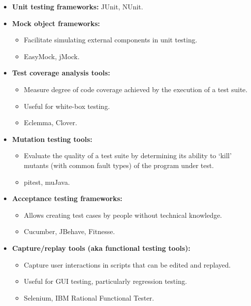 \documentclass[../ESOF_notes.tex]{subfiles}
\begin{document}
\begin{itemize}
    \item \textbf{Unit testing frameworks:} JUnit, NUnit.
    \item \textbf{Mock object frameworks:}
          \begin{itemize}
              \item Facilitate simulating external components in unit testing.
              \item EasyMock, jMock.
          \end{itemize}
    \item \textbf{Test coverage analysis tools:}
          \begin{itemize}
              \item Measure degree of code coverage
                    achieved by the execution of a test suite.
              \item Useful for white-box testing.
              \item Eclemma, Clover.
          \end{itemize}
    \item \textbf{Mutation testing tools:}
          \begin{itemize}
              \item Evaluate the quality of a test suite by
                    determining its ability to ‘kill’ mutants
                    (with common fault types) of the program under test.
              \item pitest, muJava.
          \end{itemize}
    \item \textbf{Acceptance testing frameworks:}
          \begin{itemize}
              \item Allows creating test cases by people
                    without technical knowledge.
              \item Cucumber, JBehave, Fitnesse.
          \end{itemize}
    \item \textbf{Capture/replay tools (aka functional testing tools):}
          \begin{itemize}
              \item Capture user interactions in scripts
                    that can be edited and replayed.
              \item Useful for GUI testing, particularly
                    regression testing.
              \item Selenium, IBM Rational Functional Tester.

\end{itemize}
\end{itemize}
\end{document}

